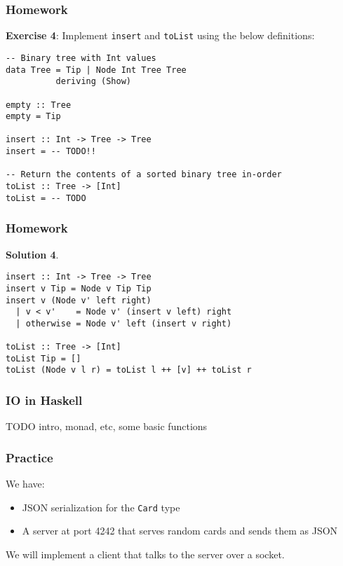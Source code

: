 \documentclass{beamer}
\begin{document}
\begin{frame}[fragile]
\frametitle{Homework}

\textbf{Exercise 4}: Implement \verb+insert+ and \verb+toList+ using the below definitions:

{\small
\begin{verbatim}
-- Binary tree with Int values
data Tree = Tip | Node Int Tree Tree
          deriving (Show)

empty :: Tree
empty = Tip

insert :: Int -> Tree -> Tree
insert = -- TODO!!

-- Return the contents of a sorted binary tree in-order
toList :: Tree -> [Int]
toList = -- TODO
\end{verbatim}
}
\end{frame}

\begin{frame}[fragile]
\frametitle{Homework}

\textbf{Solution 4}.

\bigskip

\begin{verbatim}
insert :: Int -> Tree -> Tree
insert v Tip = Node v Tip Tip
insert v (Node v' left right)
  | v < v'    = Node v' (insert v left) right
  | otherwise = Node v' left (insert v right)

toList :: Tree -> [Int]
toList Tip = []
toList (Node v l r) = toList l ++ [v] ++ toList r
\end{verbatim}

\end{frame}



\begin{frame}[fragile]
\frametitle{IO in Haskell}

TODO intro, monad, etc, some basic functions

\end{frame}


\begin{frame}[fragile]
\frametitle{Practice}

We have:

\begin{itemize}
  \item JSON serialization for the \verb+Card+ type
  \item A server at port 4242 that serves random cards and sends them
    as JSON
\end{itemize}

We will implement a client that talks to the server over a socket.

\end{frame}
\end{document}
